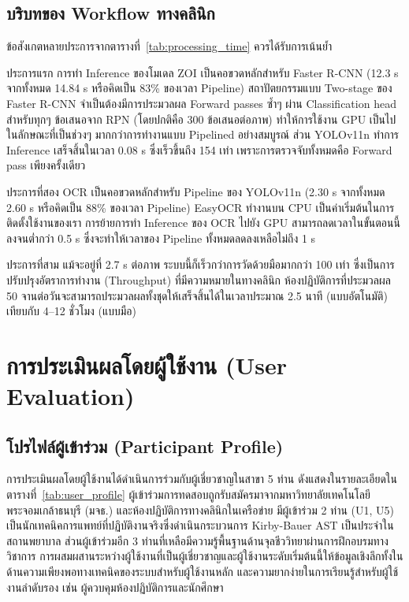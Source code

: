 \subsection{บริบทของ Workflow ทางคลินิก}

ข้อสังเกตหลายประการจากตารางที่~\ref{tab:processing_time} ควรได้รับการเน้นย้ำ

ประการแรก การทำ Inference ของโมเดล ZOI เป็นคอขวดหลักสำหรับ Faster R-CNN (12.3 s จากทั้งหมด 14.84 s หรือคิดเป็น 83\% ของเวลา Pipeline) สถาปัตยกรรมแบบ Two-stage ของ Faster R-CNN จำเป็นต้องมีการประมวลผล Forward passes ซ้ำๆ ผ่าน Classification head สำหรับทุกๆ ข้อเสนอจาก RPN (โดยปกติคือ 300 ข้อเสนอต่อภาพ) ทำให้การใช้งาน GPU เป็นไปในลักษณะที่เป็นช่วงๆ มากกว่าการทำงานแบบ Pipelined อย่างสมบูรณ์ ส่วน YOLOv11n ทำการ Inference เสร็จสิ้นในเวลา 0.08 s ซึ่งเร็วขึ้นถึง 154 เท่า เพราะการตรวจจับทั้งหมดคือ Forward pass เพียงครั้งเดียว

ประการที่สอง OCR เป็นคอขวดหลักสำหรับ Pipeline ของ YOLOv11n (2.30 s จากทั้งหมด 2.60 s หรือคิดเป็น 88\% ของเวลา Pipeline) EasyOCR ทำงานบน CPU เป็นค่าเริ่มต้นในการติดตั้งใช้งานของเรา การย้ายการทำ Inference ของ OCR ไปยัง GPU สามารถลดเวลาในขั้นตอนนี้ลงจนต่ำกว่า 0.5 s ซึ่งจะทำให้เวลาของ Pipeline ทั้งหมดลดลงเหลือไม่ถึง 1 s

ประการที่สาม แม้จะอยู่ที่ 2.7 s ต่อภาพ ระบบนี้ก็เร็วกว่าการวัดด้วยมือมากกว่า 100 เท่า ซึ่งเป็นการปรับปรุงอัตราการทำงาน (Throughput) ที่มีความหมายในทางคลินิก ห้องปฏิบัติการที่ประมวลผล 50 จานต่อวันจะสามารถประมวลผลทั้งชุดให้เสร็จสิ้นได้ในเวลาประมาณ 2.5 นาที (แบบอัตโนมัติ) เทียบกับ 4--12 ชั่วโมง (แบบมือ)

\section{การประเมินผลโดยผู้ใช้งาน (User Evaluation)}
\label{sec:user_evaluation}

\subsection{โปรไฟล์ผู้เข้าร่วม (Participant Profile)}

การประเมินผลโดยผู้ใช้งานได้ดำเนินการร่วมกับผู้เชี่ยวชาญในสาขา 5 ท่าน ดังแสดงในรายละเอียดในตารางที่~\ref{tab:user_profile} ผู้เข้าร่วมการทดสอบถูกรับสมัครมาจากมหาวิทยาลัยเทคโนโลยีพระจอมเกล้าธนบุรี (มจธ.) และห้องปฏิบัติการทางคลินิกในเครือข่าย มีผู้เข้าร่วม 2 ท่าน (U1, U5) เป็นนักเทคนิคการแพทย์ที่ปฏิบัติงานจริงซึ่งดำเนินกระบวนการ Kirby-Bauer AST เป็นประจำในสถานพยาบาล ส่วนผู้เข้าร่วมอีก 3 ท่านที่เหลือมีความรู้พื้นฐานด้านจุลชีววิทยาผ่านการฝึกอบรมทางวิชาการ การผสมผสานระหว่างผู้ใช้งานที่เป็นผู้เชี่ยวชาญและผู้ใช้งานระดับเริ่มต้นนี้ให้ข้อมูลเชิงลึกทั้งในด้านความเพียงพอทางเทคนิคของระบบสำหรับผู้ใช้งานหลัก และความยากง่ายในการเรียนรู้สำหรับผู้ใช้งานลำดับรอง เช่น ผู้ควบคุมห้องปฏิบัติการและนักศึกษา

